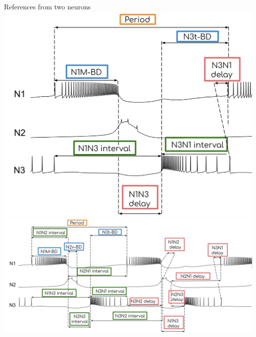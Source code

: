 \documentclass[aspectratio=43]{beamer}
\begin{document}
\begin{frame}{References from two neurons}
	\centering
	\includegraphics[height=0.5\textheight]{methods-paper-modelo/Intervals_figure_complete_2_phases.png}	
	\includegraphics[height=0.4\textheight]{methods-paper-modelo/Intervals_figure_complete.png}	
\end{frame}
\end{document}
